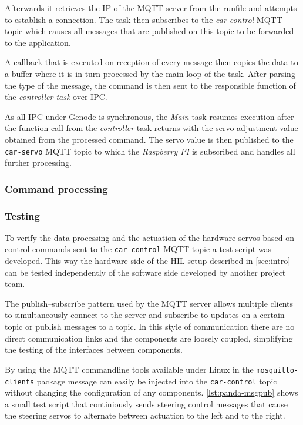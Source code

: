 Afterwards it retrieves the IP of the MQTT server from the runfile and attempts to establish a connection.
The task then subscribes to the \textit{car-control} MQTT topic which causes all messages that are published on this topic to be forwarded to the application.

A callback that is executed on reception of every message then copies the data to a buffer where it is in turn processed by the main loop of the task.
After parsing the type of the message, the command is then sent to the responsible function of the \textit{controller task} over IPC.


As all IPC under Genode is synchronous, the \textit{Main} task resumes execution after the function call from the \textit{controller} task returns with the servo adjustment value obtained from the processed command.
The servo value is then published to the \texttt{car-servo} MQTT topic to which the \textit{Raspberry PI} is subscribed and handles all further processing.


\subsubsection{Command processing}
\label{sec:panda-convert}

\subsubsection{Testing}
\label{sec:panda-testing}
To verify the data processing and the actuation of the hardware servos based on control commands sent to the \texttt{car-control} MQTT topic a test script was developed.
This way the hardware side of the HIL setup described in \autoref{sec:intro} can be tested independently of the software side developed by another project team.

The publish–subscribe pattern used by the MQTT server allows multiple clients to simultaneously connect to the server and subscribe to updates on a certain topic or publish messages to a topic.
In this style of communication there are no direct communication links and the components are loosely coupled, simplifying the testing of the interfaces between components.

By using the MQTT commandline tools available under Linux in the \texttt{mosquitto-clients} package message can easily be injected into the \texttt{car-control} topic without changing the configuration of any components.
\autoref{lst:panda-msgpub} shows a small test script that continiously sends steering control messages that cause the steering servos to alternate between actuation to the left and to the right. \\ %

